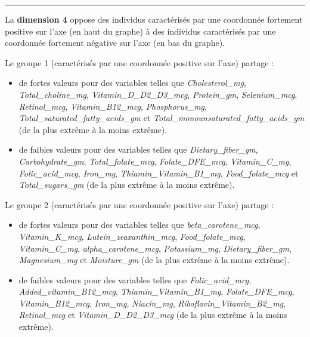\documentclass[]{article}
\providecommand{\tightlist}{%
  \setlength{\itemsep}{0pt}\setlength{\parskip}{0pt}}
\begin{document}
\begin{center}\rule{0.5\linewidth}{\linethickness}\end{center}

La \textbf{dimension 4} oppose des individus caractérisés par une
coordonnée fortement positive sur l'axe (en haut du graphe) à des
individus caractérisés par une coordonnée fortement négative sur l'axe
(en bas du graphe).

Le groupe 1 (caractérisés par une coordonnée positive sur l'axe) partage
:

\begin{itemize}
\tightlist
\item
  de fortes valeurs pour des variables telles que
  \emph{Cholesterol\_mg}, \emph{Total\_choline\_mg},
  \emph{Vitamin\_D\_D2\_D3\_mcg}, \emph{Protein\_gm},
  \emph{Selenium\_mcg}, \emph{Retinol\_mcg}, \emph{Vitamin\_B12\_mcg},
  \emph{Phosphorus\_mg}, \emph{Total\_saturated\_fatty\_acids\_gm} et
  \emph{Total\_monounsaturated\_fatty\_acids\_gm} (de la plus extrême à
  la moins extrême).
\item
  de faibles valeurs pour des variables telles que
  \emph{Dietary\_fiber\_gm}, \emph{Carbohydrate\_gm},
  \emph{Total\_folate\_mcg}, \emph{Folate\_DFE\_mcg},
  \emph{Vitamin\_C\_mg}, \emph{Folic\_acid\_mcg}, \emph{Iron\_mg},
  \emph{Thiamin\_Vitamin\_B1\_mg}, \emph{Food\_folate\_mcg} et
  \emph{Total\_sugars\_gm} (de la plus extrême à la moins extrême).
\end{itemize}

Le groupe 2 (caractérisés par une coordonnée positive sur l'axe) partage
:

\begin{itemize}
\tightlist
\item
  de fortes valeurs pour des variables telles que
  \emph{beta\_carotene\_mcg}, \emph{Vitamin\_K\_mcg},
  \emph{Lutein\_zeaxanthin\_mcg}, \emph{Food\_folate\_mcg},
  \emph{Vitamin\_C\_mg}, \emph{alpha\_carotene\_mcg},
  \emph{Potassium\_mg}, \emph{Dietary\_fiber\_gm}, \emph{Magnesium\_mg}
  et \emph{Moisture\_gm} (de la plus extrême à la moins extrême).
\item
  de faibles valeurs pour des variables telles que
  \emph{Folic\_acid\_mcg}, \emph{Added\_vitamin\_B12\_mcg},
  \emph{Thiamin\_Vitamin\_B1\_mg}, \emph{Folate\_DFE\_mcg},
  \emph{Vitamin\_B12\_mcg}, \emph{Iron\_mg}, \emph{Niacin\_mg},
  \emph{Riboflavin\_Vitamin\_B2\_mg}, \emph{Retinol\_mcg} et
  \emph{Vitamin\_D\_D2\_D3\_mcg} (de la plus extrême à la moins
  extrême).
\end{itemize}
\end{document}
